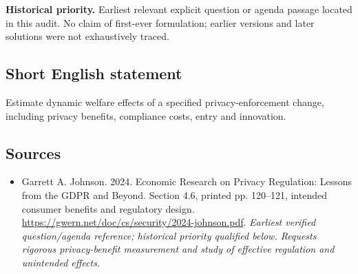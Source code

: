 \documentclass[11pt]{article}
\begin{document}
\par\textbf{Historical priority.} Earliest relevant explicit question or agenda passage located in this audit. No claim of first-ever formulation; earlier versions and later solutions were not exhaustively traced.

\subsection{Short English statement}
Estimate dynamic welfare effects of a specified privacy-enforcement change, including privacy benefits, compliance costs, entry and innovation.

\subsection{Sources}
\begin{itemize}\raggedright
\item[\textnormal{[S1]}]\hypertarget{source:30007690:1}{} Garrett A. Johnson. 2024. Economic Research on Privacy Regulation: Lessons from the GDPR and Beyond. Section 4.6, printed pp. 120–121, intended consumer benefits and regulatory design.
\url{https://gwern.net/doc/cs/security/2024-johnson.pdf}.
{\small\textit{Earliest verified question/agenda reference; historical priority qualified below. Requests rigorous privacy-benefit measurement and study of effective regulation and unintended effects.}}
\end{itemize}
\end{document}

